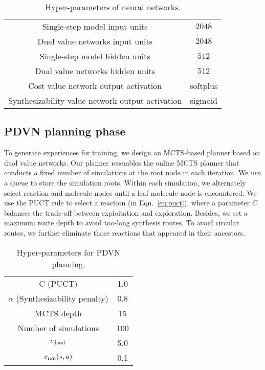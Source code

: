 \documentclass[nohyperref]{article}
\theoremstyle{plain}
\theoremstyle{definition}
\theoremstyle{remark}
\begin{document}
\begin{table}[h]
\centering
\caption{Hyper-parameters of neural networks.}
\label{tab:hyper}
\begin{tabular}{cc}
\toprule
Single-step model input units & $2048$ \\
Dual value networks input units & $2048$ \\
Single-step model hidden units & $512$ \\
Dual value networks hidden units & $512$ \\
Cost value network output activation & softplus \\
Synthesizability value network output activation & sigmoid \\
\bottomrule
\end{tabular}
\end{table}

\subsection{PDVN planning phase}

To generate experiences for training, we design an MCTS-based planner based on dual value networks. Our planner resembles the online MCTS planner that conducts a fixed number of simulations at the root node in each iteration. We use a queue to store the simulation roots.
Within each simulation, we alternately select reaction and molecule nodes until a leaf molecule node is encountered. 
We use the PUCT rule to select a reaction (in Eqn.~\ref{eq:puct}), where a parameter $C$ balances the trade-off between exploitation and exploration.
Besides, we set a maximum route depth to avoid too-long synthesis routes. 
To avoid circular routes, we further eliminate those reactions that appeared in their ancestors.

\begin{table}[h]
\centering
\caption{Hyper-parameters for PDVN planning.}
\label{tab:hyper}
\begin{tabular}{cc}
\toprule
C (PUCT) & 1.0 \\
$\alpha$ (Synthesizability penalty) & 0.8 \\
MCTS depth & 15 \\
Number of simulations & 100 \\
$c_{\rm dead}$ & 5.0 \\
$c_{\rm rxn}(s, a)$ & 0.1 \\
\bottomrule
\end{tabular}
\end{table}
\end{document}

